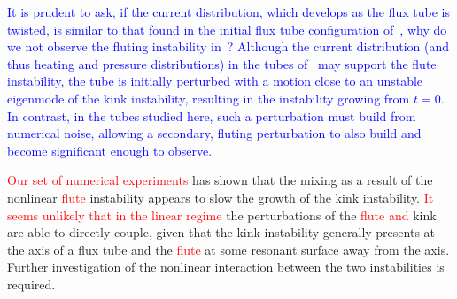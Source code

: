 \documentclass[12pt]{article}
\newcommand{\rs}[2]{\textcolor{red}{#2}}
\newcommand{\jq}[2]{\textcolor{blue}{#2}}
\begin{document}
\jq{}{It is prudent to ask, if the current distribution, which develops as the flux tube is twisted, is similar to that found in the initial flux tube configuration of~\cite{quinnEffectAnisotropicViscosity2020}, why do we not observe the fluting instability in~\cite{quinnEffectAnisotropicViscosity2020}? Although the current distribution (and thus heating and pressure distributions) in the tubes of~\cite{quinnEffectAnisotropicViscosity2020} may support the flute instability, the tube is initially perturbed with a motion close to an unstable eigenmode of the kink instability, resulting in the instability growing from $t=0$. In contrast, in the tubes studied here, such a perturbation must build from numerical noise, allowing a secondary, fluting perturbation to also build and become significant enough to observe.}

\rs{This set of experiments}{Our set of numerical experiments} has
shown that the mixing as a result of the nonlinear \rs{fluting}{flute}
instability appears to slow the growth of the kink instability. \rs{In
  the linear regime it seems unlikely that}{It seems unlikely that in
  the linear regime} the \rs{linear}{} perturbations of \rs{either}{} the
\rs{fluting}{flute} \rs{or}{and} kink are able to directly couple, given that
the kink instability generally presents at the axis of a flux tube and
the \rs{fluting}{flute} at some resonant surface away from the
axis. Further investigation of the nonlinear interaction between the
two instabilities is required. 
\end{document}
